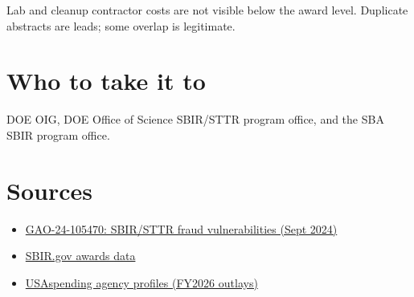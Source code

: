\documentclass[letterpaper,11pt]{article}
\providecommand{\tightlist}{\setlength{\itemsep}{0pt}\setlength{\parskip}{0pt}}
\begin{document}
Lab and cleanup contractor costs are not visible below the award level.
Duplicate abstracts are leads; some overlap is legitimate.

\hypertarget{who-to-take-it-to}{%
\section{Who to take it to}\label{who-to-take-it-to}}

DOE OIG, DOE Office of Science SBIR/STTR program office, and the SBA
SBIR program office.

\hypertarget{sources}{%
\section{Sources}\label{sources}}

\begin{itemize}
\tightlist
\item
  \href{https://www.gao.gov/products/GAO-24-105470}{GAO-24-105470:
  SBIR/STTR fraud vulnerabilities (Sept 2024)}
\item
  \href{https://www.sbir.gov/awards}{SBIR.gov awards data}
\item
  \href{https://www.usaspending.gov/agency}{USAspending agency profiles
  (FY2026 outlays)}
\end{itemize}
\end{document}
